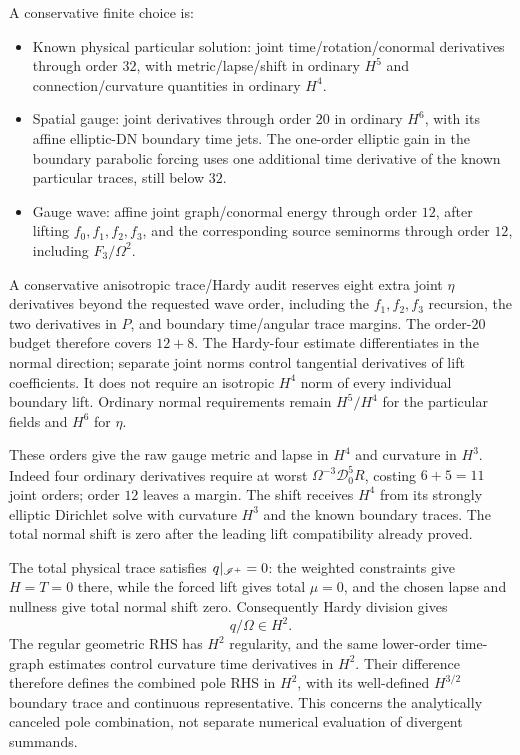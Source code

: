 A conservative finite choice is:
\begin{itemize}
\item Known physical particular solution: joint time/rotation/conormal derivatives through order $32$, with metric/lapse/shift in ordinary $H^5$ and connection/curvature quantities in ordinary $H^4$.
\item Spatial gauge: joint derivatives through order $20$ in ordinary $H^6$, with its affine elliptic-DN boundary time jets. The one-order elliptic gain in the boundary parabolic forcing uses one additional time derivative of the known particular traces, still below $32$.
\item Gauge wave: affine joint graph/conormal energy through order $12$, after lifting $f_0,f_1,f_2,f_3$, and the corresponding source seminorms through order $12$, including $F_3/\Omega^2$.
\end{itemize}
A conservative anisotropic trace/Hardy audit reserves eight extra joint $\eta$ derivatives beyond the requested wave order, including the $f_1,f_2,f_3$ recursion, the two derivatives in $P$, and boundary time/angular trace margins. The order-$20$ budget therefore covers $12+8$. The Hardy-four estimate differentiates in the normal direction; separate joint norms control tangential derivatives of lift coefficients. It does not require an isotropic $H^4$ norm of every individual boundary lift. Ordinary normal requirements remain $H^5/H^4$ for the particular fields and $H^6$ for $\eta$.

These orders give the raw gauge metric and lapse in $H^4$ and curvature in $H^3$. Indeed four ordinary derivatives require at worst $\Omega^{-3}\mathcal D_0^5R$, costing $6+5=11$ joint orders; order $12$ leaves a margin. The shift receives $H^4$ from its strongly elliptic Dirichlet solve with curvature $H^3$ and the known boundary traces. The total normal shift is zero after the leading lift compatibility already proved.

The total physical trace satisfies $q|_{\mathscr I^+}=0$: the weighted constraints give $H=T=0$ there, while the forced lift gives total $\mu=0$, and the chosen lapse and nullness give total normal shift zero. Consequently Hardy division gives
\[
 q/\Omega\in H^2.
\]
The regular geometric RHS has $H^2$ regularity, and the same lower-order time-graph estimates control curvature time derivatives in $H^2$. Their difference therefore defines the combined pole RHS in $H^2$, with its well-defined $H^{3/2}$ boundary trace and continuous representative. This concerns the analytically canceled pole combination, not separate numerical evaluation of divergent summands.

